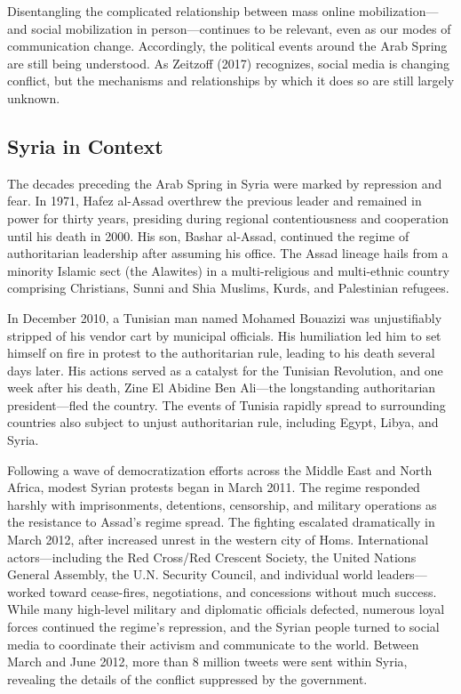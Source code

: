 \documentclass[
  english,
  man]{apa6}
\begin{document}
Disentangling the complicated relationship between mass online
mobilization---and social mobilization in person---continues to be relevant,
even as our modes of communication change. Accordingly, the political events
around the Arab Spring are still being understood. As Zeitzoff
(2017) recognizes, social media is changing conflict, but the
mechanisms and relationships by which it does so are still largely unknown.

\hypertarget{syria-in-context}{%
\subsection{Syria in Context}\label{syria-in-context}}

The decades preceding the Arab Spring in Syria were marked by repression and
fear. In 1971, Hafez al-Assad overthrew the previous leader and remained in
power for thirty years, presiding during regional contentiousness and
cooperation until his death in 2000. His son, Bashar al-Assad, continued the
regime of authoritarian leadership after assuming his office. The Assad lineage
hails from a minority Islamic sect (the Alawites) in a multi-religious and
multi-ethnic country comprising Christians, Sunni and Shia Muslims, Kurds, and
Palestinian refugees.

In December 2010, a Tunisian man named Mohamed Bouazizi was unjustifiably
stripped of his vendor cart by municipal officials. His humiliation led him to
set himself on fire in protest to the authoritarian rule, leading to his death
several days later. His actions served as a catalyst for the Tunisian
Revolution, and one week after his death, Zine El Abidine Ben Ali---the
longstanding authoritarian president---fled the country. The events of Tunisia
rapidly spread to surrounding countries also subject to unjust authoritarian
rule, including Egypt, Libya, and Syria.

Following a wave of democratization efforts across the Middle East and North
Africa, modest Syrian protests began in March 2011. The regime responded harshly
with imprisonments, detentions, censorship, and military operations as the
resistance to Assad's regime spread. The fighting escalated dramatically in
March 2012, after increased unrest in the western city of Homs. International
actors---including the Red Cross/Red Crescent Society, the United Nations
General Assembly, the U.N. Security Council, and individual world
leaders---worked toward cease-fires, negotiations, and concessions without much
success. While many high-level military and diplomatic officials defected,
numerous loyal forces continued the regime's repression, and the Syrian people
turned to social media to coordinate their activism and communicate to the
world. Between March and June 2012, more than 8 million tweets were sent within
Syria, revealing the details of the conflict suppressed by the government.
\end{document}
